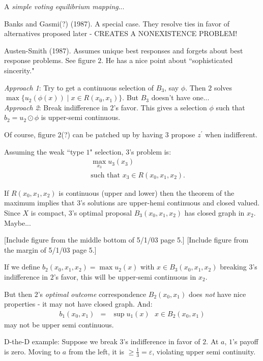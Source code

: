 \documentclass[12pt]{article}
\newcommand{\n}{\noindent}
\newcommand{\s}{\vspace{5mm}}
\begin{document}
\s
\n  A \textit{simple voting equilibrium mapping}...

\s
\n  Banks and Gasmi(?) (1987).  A special case.  They resolve ties in favor of alternatives proposed later - CREATES A NONEXISTENCE PROBLEM!

\s
\n  Austen-Smith (1987).  Assumes unique best responses and forgets about best response problems.  See figure $2$.  He has a nice point about ``sophisticated sincerity."

\s
\n  \textit{Approach 1}:  Try to get a continuous selection of $B_3$, say $\phi$.  Then $2$ solves $\max\{u_2(\phi(x))\mid x\in R(x_0,x_1)\}$.  But $B_3$ doesn't have one...\\
\textit{Approach 2}:  Break indifference in $2$'s favor.  This gives a selection $\phi$ such that $b_2=u_2\odot\phi$ is upper-semi continuous.

\s
\n Of course, figure 2(?) can be patched up by having $3$ propose $z^{\prime}$ when indifferent.

\s
\n Assuming the weak ``type $1$" selection, $3$'s problem is:
\begin{eqnarray*}
&&\max_{x_3}u_3(x_3)\\
&&\mbox{such that }x_3\in R(x_0,x_1,x_2).
\end{eqnarray*}

\s
\n  If $R(x_0,x_1,x_2)$ is continuous (upper and lower) then the theorem of the maximum implies that $3$'s solutions are upper-hemi continuous and closed valued.  Since $X$ is compact, $3$'s optimal proposal $B_3(x_0,x_1,x_2)$ has closed graph in $x_2$.  Maybe...
\begin{center}
[Include figure from the middle bottom of 5/1/03 page 5.]
[Include figure from the margin of 5/1/03 page 5.]
\end{center}

\s
\n  If we define $b_2(x_0,x_1,x_2)=\max u_2(x)$ with $x\in B_3(x_0,x_1,x_2)$ breaking $3$'s indifference in $2$'s favor, this will be upper-semi continuous in $x_2$.

\s
\n But then $2$'s \textit{optimal outcome}  correspondence $B_2(x_0,x_1)$ does \textit{not} have nice properties - it may not have closed graph.  And:
\begin{eqnarray*}
b_1(x_0,x_1)&=&\sup u_1(x)\mbox{ }x\in B_2(x_0,x_1)
\end{eqnarray*} may not be upper semi continuous.

\s
\n  D-the-D example: Suppose we break $3$'s indifference in favor of $2$.  At $a$, $1$'s payoff is zero.  Moving to $a$ from the left, it is $\geq\frac{1}{3}=\varepsilon$, violating upper semi continuity.  
\end{document}
